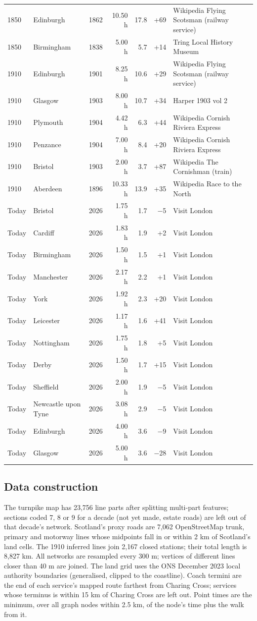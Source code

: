 \documentclass[11pt,a4paper]{article}
\begin{document}
{\begin{longtable}{llrrrrp{5.2cm}}
1850 & Edinburgh & 1862 & 10.50 h & 17.8 & +69 & Wikipedia Flying Scotsman (railway service)\\
1850 & Birmingham & 1838 & 5.00 h & 5.7 & +14 & Tring Local History Museum\\
1910 & Edinburgh & 1901 & 8.25 h & 10.6 & +29 & Wikipedia Flying Scotsman (railway service)\\
1910 & Glasgow & 1903 & 8.00 h & 10.7 & +34 & Harper 1903 vol 2\\
1910 & Plymouth & 1904 & 4.42 h & 6.3 & +44 & Wikipedia Cornish Riviera Express\\
1910 & Penzance & 1904 & 7.00 h & 8.4 & +20 & Wikipedia Cornish Riviera Express\\
1910 & Bristol & 1903 & 2.00 h & 3.7 & +87 & Wikipedia The Cornishman (train)\\
1910 & Aberdeen & 1896 & 10.33 h & 13.9 & +35 & Wikipedia Race to the North\\
Today & Bristol & 2026 & 1.75 h & 1.7 & $-$5 & Visit London\\
Today & Cardiff & 2026 & 1.83 h & 1.9 & +2 & Visit London\\
Today & Birmingham & 2026 & 1.50 h & 1.5 & +1 & Visit London\\
Today & Manchester & 2026 & 2.17 h & 2.2 & +1 & Visit London\\
Today & York & 2026 & 1.92 h & 2.3 & +20 & Visit London\\
Today & Leicester & 2026 & 1.17 h & 1.6 & +41 & Visit London\\
Today & Nottingham & 2026 & 1.75 h & 1.8 & +5 & Visit London\\
Today & Derby & 2026 & 1.50 h & 1.7 & +15 & Visit London\\
Today & Sheffield & 2026 & 2.00 h & 1.9 & $-$5 & Visit London\\
Today & Newcastle upon Tyne & 2026 & 3.08 h & 2.9 & $-$5 & Visit London\\
Today & Edinburgh & 2026 & 4.00 h & 3.6 & $-$9 & Visit London\\
Today & Glasgow & 2026 & 5.00 h & 3.6 & $-$28 & Visit London\\
\bottomrule\end{longtable}}
\subsection{Data construction}
The turnpike map has 23,756 line parts after splitting multi-part features; sections coded 7, 8 or 9 for a decade (not yet made, estate roads) are left out of that decade's network. Scotland's proxy roads are 7,062 OpenStreetMap trunk, primary and motorway lines whose midpoints fall in or within 2 km of Scotland's land cells. The 1910 inferred lines join 2,167 closed stations; their total length is 8,827 km. All networks are resampled every 300 m; vertices of different lines closer than 40 m are joined. The land grid uses the ONS December 2023 local authority boundaries (generalised, clipped to the coastline). Coach termini are the end of each service's mapped route farthest from Charing Cross; services whose terminus is within 15 km of Charing Cross are left out. Point times are the minimum, over all graph nodes within 2.5 km, of the node's time plus the walk from it.
\end{document}
